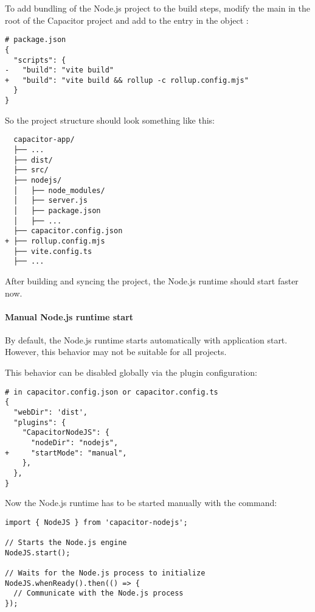 To add bundling of the Node.js project to the build steps, modify the main  in the root of the Capacitor project 
and add  to the  entry in the  object \cite{npm, rollup}:

\begin{verbatim}
# package.json
{
  "scripts": {
-   "build": "vite build"
+   "build": "vite build && rollup -c rollup.config.mjs"
  }
}
\end{verbatim}

So the project structure should look something like this:

\begin{verbatim}
  capacitor-app/
  ├── ...
  ├── dist/
  ├── src/
  ├── nodejs/
  │   ├── node_modules/
  │   ├── server.js
  │   ├── package.json
  │   ├── ...
  ├── capacitor.config.json
+ ├── rollup.config.mjs
  ├── vite.config.ts
  ├── ... 
\end{verbatim}

After building and syncing the project, the Node.js runtime should start faster now.

\newpage

\paragraph{Manual Node.js runtime start}
\label{sec:Capacitor-NodeJS:ManualRuntimeStart}

By default, the Node.js runtime starts automatically with application start.
However, this behavior may not be suitable for all projects.

This behavior can be disabled globally via the  plugin configuration:

\begin{verbatim}
# in capacitor.config.json or capacitor.config.ts
{
  "webDir": 'dist',
  "plugins": {
    "CapacitorNodeJS": {
      "nodeDir": "nodejs",
+     "startMode": "manual",
    },
  },
} 
\end{verbatim}

Now the Node.js runtime has to be started manually with the  command:

\begin{verbatim}
import { NodeJS } from 'capacitor-nodejs';

// Starts the Node.js engine
NodeJS.start();

// Waits for the Node.js process to initialize
NodeJS.whenReady().then(() => {
  // Communicate with the Node.js process
});
\end{verbatim}

